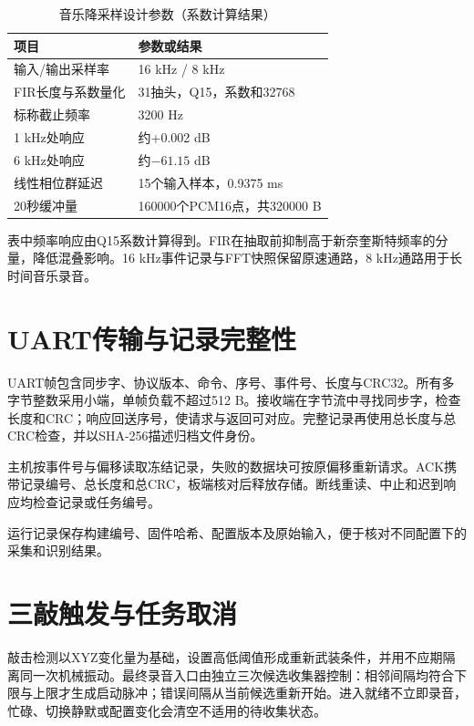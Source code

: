 \begin{table}[H]\centering\caption{音乐降采样设计参数（系数计算结果）}\small
\begin{tabularx}{\linewidth}{p{49mm}Y}\toprule
项目 & 参数或结果\\\midrule
输入/输出采样率 & 16 kHz / 8 kHz\\
FIR长度与系数量化 & 31抽头，Q15，系数和32768\\
标称截止频率 & 3200 Hz\\
1 kHz处响应 & 约+0.002 dB\\
6 kHz处响应 & 约$-61.15$ dB\\
线性相位群延迟 & 15个输入样本，0.9375 ms\\
20秒缓冲量 & 160000个PCM16点，共320000 B\\\bottomrule
\end{tabularx}\end{table}

表中频率响应由Q15系数计算得到。FIR在抽取前抑制高于新奈奎斯特频率的分量，降低混叠影响。16 kHz事件记录与FFT快照保留原速通路，8 kHz通路用于长时间音乐录音。

\section{UART传输与记录完整性}
UART帧包含同步字、协议版本、命令、序号、事件号、长度与CRC32。所有多字节整数采用小端，单帧负载不超过512 B。接收端在字节流中寻找同步字，检查长度和CRC；响应回送序号，使请求与返回可对应。完整记录再使用总长度与总CRC检查，并以SHA-256描述归档文件身份。


主机按事件号与偏移读取冻结记录，失败的数据块可按原偏移重新请求。ACK携带记录编号、总长度和总CRC，板端核对后释放存储。断线重读、中止和迟到响应均检查记录或任务编号。

运行记录保存构建编号、固件哈希、配置版本及原始输入，便于核对不同配置下的采集和识别结果。

\section{三敲触发与任务取消}
敲击检测以XYZ变化量为基础，设置高低阈值形成重新武装条件，并用不应期隔离同一次机械振动。最终录音入口由独立三次候选收集器控制：相邻间隔均符合下限与上限才生成启动脉冲；错误间隔从当前候选重新开始。进入就绪不立即录音，忙碌、切换静默或配置变化会清空不适用的待收集状态。

